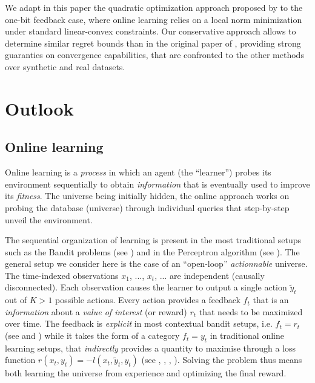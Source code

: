 \documentclass[preprint,12pt,authoryear]{elsarticle}
\begin{document}
We adapt in this paper the quadratic optimization approach proposed by \cite{crammer2006online} to the one-bit feedback case, where online learning relies on a local norm minimization under standard linear-convex constraints. Our conservative approach allows to determine similar regret bounds than in the original paper of \cite{crammer2006online}, providing strong guaranties on  convergence capabilities, that are confronted to the other methods over synthetic and real datasets.  

\section{Outlook}

\subsection{Online learning} Online learning is a \textit{process} in which an agent (the ``learner'') probes its environment sequentially to obtain \textit{information} that is eventually used to improve its \textit{fitness}.
The universe being initially hidden, the online approach works on probing the database (universe) through individual queries that step-by-step unveil the environment. 

The sequential organization of learning is present in the most traditional setups such as the Bandit problems (see \cite{robbins1952bandit}) and in the Perceptron algorithm (see \cite{rosenblatt1958perceptron}). The general setup we consider here is the case of an ``open-loop'' \textit{actionnable} universe. The time-indexed observations $x_1$, ..., $x_t$, ... are independent (causally disconnected). Each observation causes the learner to output a single action $\tilde{y}_t$ out of $K > 1$ possible actions. Every action provides a feedback $f_t$ that is an \textit{information} about a \textit{value of interest} (or reward) $r_t$ that needs to be maximized over time. The feedback is \textit{explicit} in most contextual bandit setups, i.e. $f_t=r_t$ (see \cite{lai1985asymptotically} and \cite{auer2002finite}) while it takes the form of a category $f_t=y_t$ in traditional online learning setups, that \textit{indirectly} provides a quantity to maximise through a loss function $r(x_t, y_t) = -l(x_t,\tilde{y}_t, y_t)$ (see  \cite{duda1973pattern}, \cite{freund1999large}, \cite{kivinen2004online}, \cite{crammer2006online}). Solving the problem thus means both  learning the universe from experience and optimizing the final reward. 
\end{document}
